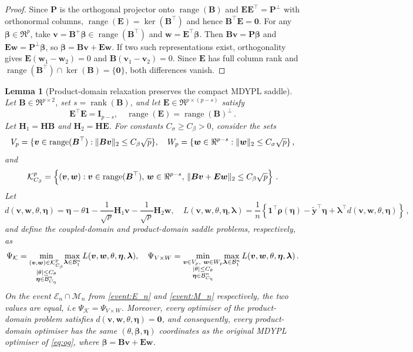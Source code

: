 \documentclass{article}
\makeatletter
\newtheorem{lemma}{Lemma}
\theoremstyle{definition}
\newcommand{\vnorm}[1]{%
	\ensuremath{%
		\if@display
		\left\| #1 \right\|
		\else
		\| #1 \|
		\fi
	}%
}
\newcommand{\abs}[1]{%
	\ensuremath{%
		\if@display
		\left| #1 \right|
		\else
		\lvert #1 \rvert
		\fi
	}%
}
\newcommand*{\bb}{\boldsymbol}
\def\bw {\bb{w}}
\def\bE {\bb{E}}
\def\bH {\bb{H}}
\def\bv{\bb{v}}
\def\bYtil{\widetilde{\bb{y}}}
\def\bB{\bb{B}}
\def\bbeta{\bb{\beta}}
\def\bH{\bb{H}}
\def\blambda{\bb{\lambda}}
\newcommand{\rank}{\operatorname{rank}}
\newcommand{\range}{\operatorname{range}}
\makeatother
\begin{document}
\begin{bibunit}
\begin{proof}
Since $\bb P$ is the orthogonal projector onto
$\range(\bb B)$ and
$\bb E\bb E^\top=\bb P^\perp$ with orthonormal columns,
$\range(\bb E)=\ker(\bb B^\top)$ and hence
$\bb B^\top\bb E=\bb0$. For any $\bbeta\in\Re^p$, take
$\bv=\bb B^+\bbeta\in\range(\bb B^\top)$ and
$\bw=\bb E^\top\bbeta$. Then
$\bb B\bv=\bb P\bbeta$ and
$\bb E\bw=\bb P^\perp\bbeta$, so
$\bbeta=\bb B\bv+\bb E\bw$. If two such representations exist,
orthogonality gives $\bb E(\bw_1-\bw_2)=0$ and
$\bb B(\bv_1-\bv_2)=0$. Since $\bb E$ has full column rank and
$\range(\bb B^\top)\cap\ker(\bb B)=\{\bb0\}$, both differences
vanish.
\end{proof}


\begin{lemma}[Product-domain relaxation preserves the compact MDYPL saddle]
\label{lemma:product_domain_relaxation}
Let $\bb B\in\Re^{p\times 2}$, set $s=\rank(\bb B)$, and let
$\bE\in\Re^{p\times(p-s)}$ satisfy
$$
	\bE^\top\bE=\bb I_{p-s},
	\quad
	\range(\bE)=\range(\bb B)^\perp \,.
$$
Let $\bH_1=\bH\bb B$ and $\bH_2=\bH\bE$.
For constants $C_\sigma \geq C_\beta > 0$, consider the sets
$$
V_p=\{\bv\in\operatorname{range}(\bb B^\top):\vnorm{\bb B \bv}_2\le C_\beta\sqrt p\},
\quad
W_p=\{\bw\in\Re^{p-s}:\vnorm{\bw}_2\le C_\sigma\sqrt p\} \,,
$$
and
$$
    \mathcal K^p_{C_\beta}
    =
    \left\{
        (\bv,\bw):
        \bv\in\operatorname{range}(\bB^\top),\,
        \bw\in\Re^{p-s},\,
        \vnorm{\bB\bv+\bE\bw}_2\le C_\beta\sqrt p
    \right\} \,.
$$
Let
$$
    d(\bv,\bw,\theta,\bb{\eta})
    =
    \bb{\eta}-\theta\bb{1}
    -
    \frac{1}{\sqrt p}\bH_1\bv
    -
    \frac{1}{\sqrt p}\bH_2\bw, \quad L(\bv, \bw, \theta, \bb \eta, \blambda) = \frac{1}{n}
\left\{
    \bb{1}^\top\bb \rho(\bb{\eta})-\bYtil^\top\bb{\eta}
    +
    \bb{\lambda}^\top d(\bv,\bw,\theta,\bb{\eta})
\right\} \,, 
$$
and 
define the coupled-domain and product-domain saddle problems, respectively, as
$$
\Psi_{\mathcal K}
=
\underset{\substack{(\bv,\bw)\in\mathcal K^p_{C_\beta}\\
\abs{\theta}\leq C_\theta \\
\bb{\eta}\in\mathcal B^n_{C_\eta}}}{\min}
\underset{\bb{\lambda}\in\mathcal B^n_1}{\max}
\, L(\bv, \bw, \theta, \bb \eta, \blambda) , \quad 
\Psi_{V \times W}
=
\underset{\substack{\bv\in V_p,\ \bw\in W_p\\
\abs{\theta}\le C_\theta\\ 
\bb{\eta}\in\mathcal B^n_{C_\eta}}}{\min}
\underset{\bb{\lambda}\in\mathcal B^n_1}{\max} \,
L(\bv, \bw, \theta, \bb \eta, \blambda)  \,.
$$
On the event $\mathcal{E}_n \cap \mathcal M_n$ from \eqref{event:E_n} and \eqref{event:M_n} respectively, 
the two values are equal, i.e
$
    \Psi_{\mathcal K}=\Psi_{V \times W}
$. 
Moreover, every optimiser of the product-domain problem satisfies
$
    d(\bv,\bw,\theta,\bb{\eta})=\bb{0}
$,
and consequently, every product-domain optimiser has the same
$
    (\theta,\bbeta,\bb{\eta})
$
coordinates as the original MDYPL optimiser of \eqref{eq:og}, where $\bbeta=\bB\bv+\bE\bw$.
\end{lemma}


\end{bibunit}
\end{document}
